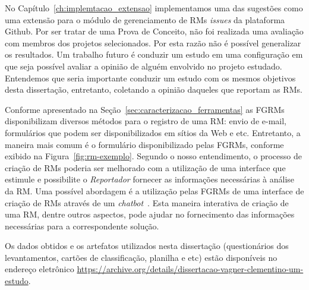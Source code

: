 No Capítulo~\ref{ch:implemtacao_extensao} implementamos uma das sugestões como
uma extensão para o módulo de gerenciamento de RMs \textit{issues} da
plataforma Github. Por ser tratar de uma Prova de Conceito, não foi realizada
uma avaliação com membros dos projetos selecionados. Por esta razão não é
possível generalizar os resultados. Um trabalho futuro é conduzir um estudo em
uma configuração em que seja possível avaliar a opinião de alguém envolvido no
projeto estudado. Entendemos que seria importante conduzir um estudo com os
mesmos objetivos desta dissertação, entretanto, coletando a opinião daqueles
que reportam as RMs.

Conforme apresentado na Seção~\ref{sec:caracterizacao_ferramentas} as FGRMs
disponibilizam diversos métodos para o registro de uma RM\@: envio de e-mail,
formulários que podem ser disponibilizados em sítios da Web e etc. Entretanto,
a maneira mais comum é o formulário disponibilizado pelas FGRMs, conforme
exibido na Figura~\ref{fig:rm-exemplo}. Segundo o nosso entendimento, o
processo de criação de RMs poderia ser melhorado com a utilização de uma
interface que estimule e possibilite o \textit{Reportador} fornecer as
informações necessárias à análise da RM\@. Uma possível abordagem é a
utilização pelas FGRMs de uma interface de criação de RMs através de um
\textit{chatbot}~\cite{mauldin1994chatterbots,huang2007extracting}. Esta
maneira interativa de criação de uma RM, dentre outros aspectos, pode ajudar no
fornecimento das informações necessárias para a correspondente solução.

Os dados obtidos e os artefatos utilizados nesta dissertação (questionários dos
levantamentos, cartões de classificação, planilha e etc) estão disponíveis no
endereço eletrônico
\url{https://archive.org/details/dissertacao-vagner-clementino-um-estudo}.
